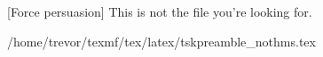 [Force persuasion] This is not the file you're looking for. 
 
 /home/trevor/texmf/tex/latex/tskpreamble_nothms.tex
